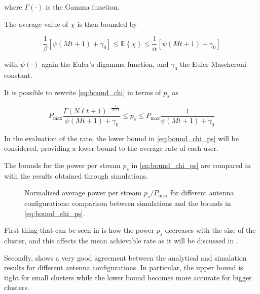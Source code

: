 \noindent
where $\Gamma\left(\cdot\right)$ is the Gamma function.

The average value of $\chi$ is then bounded by

\begin{equation} \label{eq:bound_chi}
    \frac{1}{\beta}\left[\psi\left(Mt + 1\right) + \gamma_0\right] \leq
    \mathbb{E}\left\{\chi\right\} \leq
    \frac{1}{\alpha}\left[\psi\left(Mt + 1\right) + \gamma_0\right]
\end{equation}

\noindent
with $\psi\left(\cdot\right)$ again the Euler's digamma function, and $\gamma_0$ the Euler-Mascheroni
constant.

It is possible to rewrite \eqref{eq:bound_chi} in terms of $p_s$ as

\begin{equation} \label{eq:bound_chi_ps}
    P_{\max} \frac{\Gamma\left(N\ell t + 1\right)^{-\frac{1}{N\ell t}}}
        {\psi\left(Mt + 1\right) + \gamma_0} \leq p_s \leq
        P_{\max}\frac{1}{\psi\left(Mt + 1\right) + \gamma_0}
\end{equation}

In the evaluation of the rate, the lower bound in \eqref{eq:bound_chi_ps} will
be considered, providing a lower bound to the average rate of each user.

The bounds for the power per stream $p_s$ in \eqref{eq:bound_chi_ps} are
compared in  with the results obtained through simulations.

\begin{figure}[t]
\begin{center}
\dummybox
\end{center}
\caption{Normalized average power per stream $p_s / P_{\max}$ for different
antenna configurations: comparison between simulations and the bounds in
\eqref{eq:bound_chi_ps}.}
\label{fig:bound_chi}
\end{figure}

First thing that can be seen in  is how the power $p_s$
decreases with the size of the cluster, and this affects the mean achievable
rate as it will be discussed in .

Secondly,  shows a very good agreement between the
analytical and simulation results for different antenna configurations. In
particular, the upper bound is tight for small clusters while the lower bound
becomes more accurate for bigger clusters.

